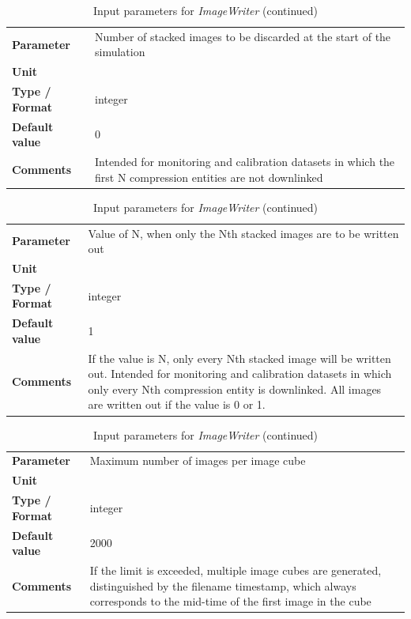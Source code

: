 \documentclass[11pt]{article}      %
\def\HCode#1{}
\def\htmlanchor#1{\HCode{<a id="#1"></a>}}
\begin{document}
\begin{table}[hb]
  \label{tab:output3}
\end{table}

\begin{table}[hb]
  \caption{Input parameters for {\it ImageWriter} (continued)}

  \htmlanchor{numberOfCEsToOmitAtStart}
  \begin{tabular}{| l | p{13cm} |}
    \hline 
    {\bf Parameter} & Number of stacked images to be discarded at the start of the simulation\\
    {\bf Unit} & \\
    {\bf Type / Format} & integer\\
    {\bf Default value} & 0\\
    {\bf Comments} & Intended for monitoring and calibration datasets in which the first N compression entities are not downlinked\\
    \hline
  \end{tabular}
  \bigskip

  \htmlanchor{onlyWriteEveryNthCE}
  \begin{tabular}{| l | p{13cm} |}
    \hline 
    {\bf Parameter} & Value of N, when only the Nth stacked images are to be written out\\
    {\bf Unit} & \\
    {\bf Type / Format} & integer\\
    {\bf Default value} & 1\\
    {\bf Comments} & If the value is N, only every Nth stacked image will be written out. Intended for monitoring and calibration datasets in which only every Nth compression entity is downlinked. All images are written out if the value is 0 or 1.\\
    \hline
  \end{tabular}
  \bigskip

  \htmlanchor{maxImagesPerCube}
  \begin{tabular}{| l | p{13cm} |}
    \hline 
    {\bf Parameter} & Maximum number of images per image cube\\
    {\bf Unit} & \\
    {\bf Type / Format} & integer\\
    {\bf Default value} & 2000\\
    {\bf Comments} & If the limit is exceeded, multiple image cubes are generated, distinguished by the filename timestamp, which always corresponds to the mid-time of the first image in the cube\\
    \hline
  \end{tabular}
  \bigskip

  \label{tab:output4}
\end{table}
\end{document}
